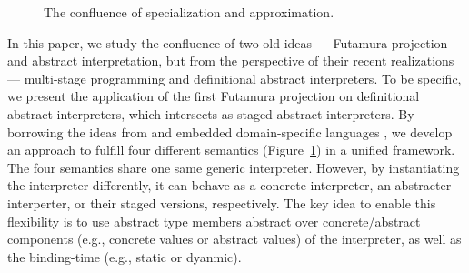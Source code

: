 \begin{figure}[h]
  \caption{The confluence of specialization and approximation.}
  \label{confluence}
\end{figure}

In this paper, we study the confluence of two old ideas --- Futamura projection
and abstract interpretation, but from the perspective of their recent
realizations --- multi-stage programming and definitional abstract interpreters.
To be specific, we present the application of the first Futamura projection on
definitional abstract interpreters, which intersects as staged abstract
interpreters. By borrowing the ideas from 
\cite{DBLP:conf/popl/LiangHJ95, DBLP:journals/pacmpl/DaraisLNH17,
Sergey:2013:MAI:2491956.2491979} and embedded domain-specific languages
\cite{DBLP:conf/snapl/RompfBLSJAOSKDK15, DBLP:journals/jfp/CaretteKS09,
DBLP:conf/icfp/GibbonsW14}, we develop an approach to fulfill four different
semantics (Figure~\ref{confluence}) in a unified framework. The four semantics
share one same generic interpreter. However, by instantiating the interpreter
differently, it can behave as a concrete interpreter, an abstracter interperter,
or their staged versions, respectively. The key idea to enable this flexibility
is to use abstract type members  abstract over concrete/abstract components
(e.g., concrete values or abstract values) of the interpreter, as well as the
binding-time (e.g., static or dyanmic).

